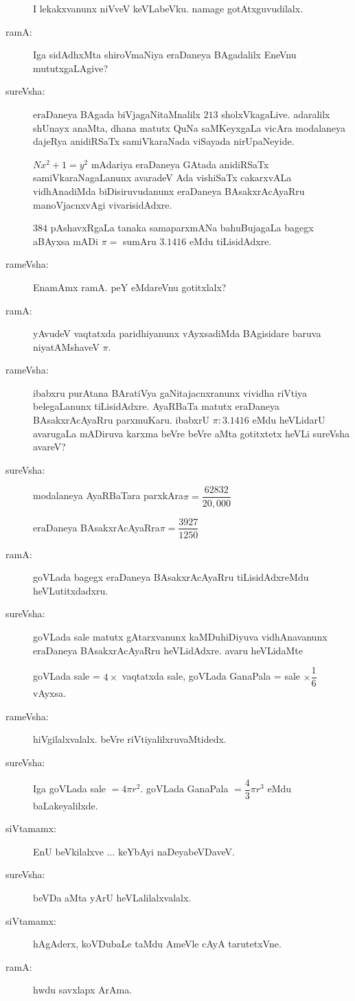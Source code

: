 \begin{description}
I lekakxvanunx niVveV keVLabeVku. namage gotAtxguvudilalx.

\item[ramA:] Iga sidAdhxMta shiroVmaNiya eraDaneya BAgadalilx EneVnu mututxgaLAgive?

\item[sureVsha:] eraDaneya BAgada biVjagaNitaMnalilx $213$ sholxVkagaLive. adaralilx shUnayx anaMta, dhana matutx QuNa saMKeyxgaLa vicAra modalaneya dajeRya anidiRSaTx samiVkaraNada viSayada nirUpaNeyide.

$Nx^{2}+1=y^{2}$ mAdariya eraDaneya GAtada anidiRSaTx samiVkaraNagaLanunx avaradeV Ada vishiSaTx cakarxvALa vidhAnadiMda biDisiruvudanunx eraDaneya BAsakxrAcAyaRru manoVjacnxvAgi vivarisidAdxre.

$384$ pAshavxRgaLa tanaka samaparxmANa bahuBujagaLa bagegx aBAyxsa mADi $\pi=$ sumAru $3.1416$ eMdu tiLisidAdxre.

\item[rameVsha:] EnamAmx ramA. peY eMdareVnu gotitxlalx?

\item[ramA:] yAvudeV vaqtatxda paridhiyanunx vAyxsadiMda BAgisidare baruva niyatAMshaveV $\pi$.

\item[rameVsha:] ibabxru purAtana BAratiVya gaNitajacnxranunx vividha riVtiya belegaLanunx tiLisidAdxre. AyaRBaTa matutx eraDaneya BAsakxrAcAyaRru parxmuKaru. ibabxrU $\pi:3.1416$ eMdu heVLidarU avarugaLa mADiruva karxma beVre beVre aMta gotitxtetx heVLi sureVsha avareV?

\item[sureVsha:] modalaneya AyaRBaTara parxkAra\quad $\pi=\dfrac{62832}{20,000}$

eraDaneya BAsakxrAcAyaRra\quad $\pi=\dfrac{3927}{1250}$

\item[ramA:] goVLada bagegx eraDaneya BAsakxrAcAyaRru tiLisidAdxreMdu heVLutitxdadxru.

\item[sureVsha:] goVLada sale matutx gAtarxvanunx kaMDuhiDiyuva vidhAnavanunx eraDaneya BAsakxrAcAyaRru heVLidAdxre. avaru heVLidaMte 

goVLada sale = $4\times{}$ vaqtatxda sale, goVLada GanaPala = sale $\times\dfrac{1}{6}$ vAyxsa.

\item[rameVsha:] hiVgilalxvalalx. beVre riVtiyalilxruvaMtidedx.

\item[sureVsha:] Iga goVLada sale $=4\pi r^{2}$. goVLada GanaPala $=\dfrac{4}{3}\pi r^{3}$ eMdu baLakeyalilxde.

\item[siVtamamx:] EnU beVkilalxve ... keYbAyi naDeyabeVDaveV.

\item[sureVsha:] beVDa aMta yArU heVLalilalxvalalx.

\item[siVtamamx:] hAgAderx, koVDubaLe taMdu AmeVle cAyA tarutetxVne.

\item[ramA:] hwdu savxlapx ArAma.
\end{description}
